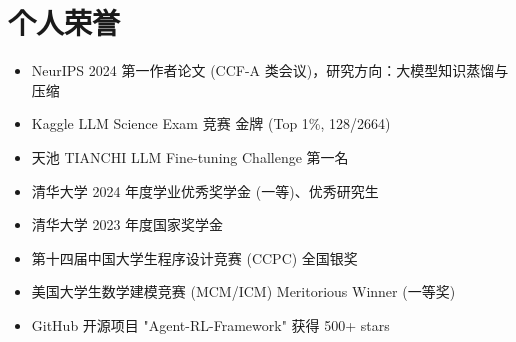 \documentclass{resume-photo}
\begin{document}
\section{个人荣誉}
\begin{itemize}
  \item NeurIPS 2024 第一作者论文 (CCF-A 类会议)，研究方向：大模型知识蒸馏与压缩
  \item Kaggle LLM Science Exam 竞赛 金牌 (Top 1\%, 128/2664)
  \item 天池 TIANCHI LLM Fine-tuning Challenge 第一名
  \item 清华大学 2024 年度学业优秀奖学金 (一等)、优秀研究生
  \item 清华大学 2023 年度国家奖学金
  \item 第十四届中国大学生程序设计竞赛 (CCPC) 全国银奖
  \item 美国大学生数学建模竞赛 (MCM/ICM) Meritorious Winner (一等奖)
  \item GitHub 开源项目 "Agent-RL-Framework" 获得 500+ stars
\end{itemize}
\end{document}
